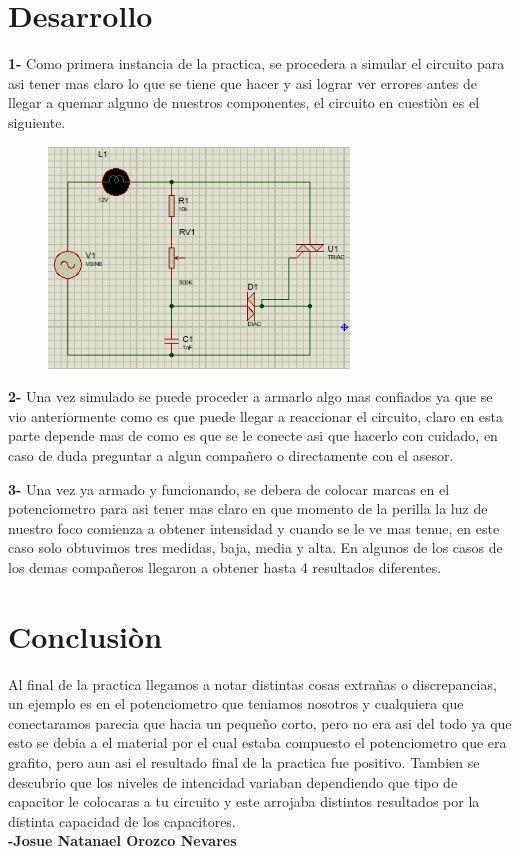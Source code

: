 \documentclass[12pt,a4paper]{article}
\begin{document}
\section{Desarrollo}
\textbf{1-} Como primera instancia de la practica, se procedera a simular el circuito para asi tener mas claro lo que se tiene que hacer y asi lograr ver errores antes de llegar a quemar alguno de nuestros componentes, el circuito en cuestiòn es el siguiente.
\begin{figure}[h!]
\centering
\includegraphics[width=8cm]{Practica3.jpg} 
\end{figure}

\textbf{2-} Una vez simulado se puede proceder a armarlo algo mas confiados ya que se vio anteriormente como es que puede llegar a reaccionar el circuito, claro en esta parte depende mas de como es que se le conecte asi que hacerlo con cuidado, en caso de duda preguntar a algun compañero o directamente con el asesor.
\newpage

\textbf{3-} Una vez ya armado y funcionando, se debera de colocar marcas en el potenciometro para asi tener mas claro en que momento de la perilla la luz de nuestro foco comienza a obtener intensidad y cuando se le ve mas tenue, en este caso solo obtuvimos tres medidas, baja, media y alta. En algunos de los casos de los demas compañeros llegaron a obtener hasta 4 resultados diferentes.

\section{Conclusiòn}
Al final de la practica llegamos a notar distintas cosas extrañas o discrepancias, un ejemplo es en el potenciometro que teniamos nosotros y cualquiera que conectaramos parecia que hacia un pequeño corto, pero no era asi del todo ya que esto se debia a el material por el cual estaba compuesto el potenciometro que era grafito, pero aun asi el resultado final de la practica fue positivo.
Tambien se descubrio que los niveles de intencidad variaban dependiendo que tipo de capacitor le colocaras a tu circuito y este arrojaba distintos resultados por la distinta capacidad de los capacitores.\\
\textbf{-Josue Natanael Orozco Nevares}    
\end{document}
